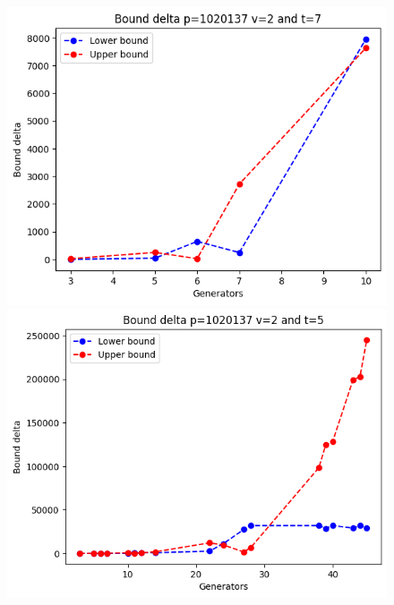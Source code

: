 \documentclass{article}
\begin{document}
\begin{figure}[H]
    \begin{minipage}{.49\textwidth}
            \centering
            \includegraphics[width=\textwidth]{../plots/tuples_figures/explosion_example.png}
    \end{minipage}
    \begin{minipage}{.49\textwidth}
            \centering
            \includegraphics[width=\textwidth]{../plots/tuples_figures/explosion_example_2.png}
    \end{minipage}
\end{figure}
\end{document}
